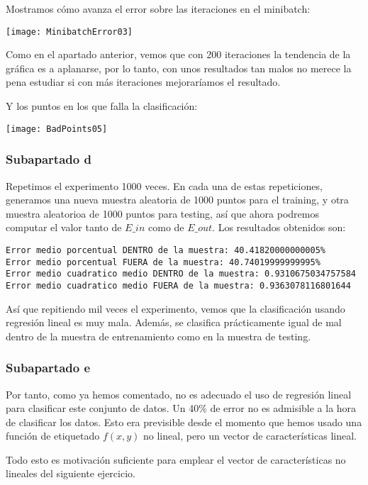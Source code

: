 \documentclass[11pt]{article}
\begin{document}
Mostramos cómo avanza el error sobre las iteraciones en el minibatch:

\texttt{[image: MinibatchError03]}

Como en el apartado anterior, vemos que con 200 iteraciones la tendencia de la gráfica es a aplanarse, por lo tanto, con unos resultados tan malos no merece la pena estudiar si con más iteraciones mejoraríamos el resultado.

Y los puntos en los que falla la clasificación:

\texttt{[image: BadPoints05]}

\subsubsection{Subapartado d}

Repetimos el experimento 1000 veces. En cada una de estas repeticiones, generamos una nueva muestra aleatoria de 1000 puntos para el training, y otra muestra aleatorioa de 1000 puntos para testing, así que ahora podremos computar el valor tanto de $E\_in$ como de $E\_out$. Los resultados obtenidos son:

\begin{lstlisting}
Error medio porcentual DENTRO de la muestra: 40.41820000000005%
Error medio porcentual FUERA de la muestra: 40.74019999999995%
Error medio cuadratico medio DENTRO de la muestra: 0.9310675034757584
Error medio cuadratico medio FUERA de la muestra: 0.9363078116801644
\end{lstlisting}

Así que repitiendo mil veces el experimento, vemos que la clasificación usando regresión lineal es muy mala. Además, se clasifica prácticamente igual de mal dentro de la muestra de entrenamiento como en la muestra de testing.

\subsubsection{Subapartado e}

Por tanto, como ya hemos comentado, no es adecuado el uso de regresión lineal para clasificar este conjunto de datos. Un 40\% de error no es admisible a la hora de clasificar los datos. Esto era previsible desde el momento que hemos usado una función de etiquetado $f(x,y)$ no lineal, pero un vector de características lineal.

Todo esto es motivación suficiente para emplear el vector de características no lineales del siguiente ejercicio.
\end{document}

